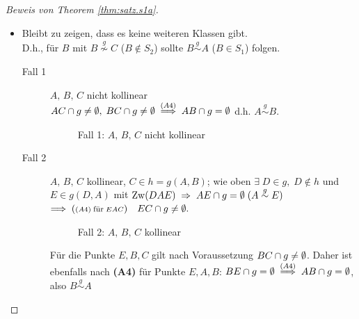\begin{proof}[Beweis von Theorem \ref{thm:satz.s1a}]
\begin{itemize}
        \item Bleibt zu zeigen, dass es keine weiteren Klassen gibt.\\
            D.h., für $B$ mit $B \stackrel{g}{\nsim} C$ ($B \notin S_2$) sollte $B
            \stackrel{g}{\sim} A$ ($B \in S_1$) folgen.


        \begin{description}
            \item[Fall 1] $A,\,B,\,C$ nicht kollinear\\
                ${AC} \cap g \neq \emptyset,\; {BC} \cap g \neq \emptyset\;
                \stackrel{(A4)}{\Longrightarrow}\; {AB} \cap g = \emptyset$ d.h. $A
                \stackrel{g}{\sim} B$.

                \begin{figure}[h]
                    
                    \caption{Fall 1: $A,\,B,\,C$ nicht kollinear}
                \end{figure}

            \item[Fall 2] $A,\, B,\, C$ kollinear, $C \in h = g(A,B)$; wie oben $\exists\; D \in
                g,\; D \notin h$ und $E \in g(D,A)$ mit $\operatorname{Zw}(DAE)\; \Rightarrow\; {AE} \cap g =
                \emptyset\; (A \stackrel{g}{\sim} E)$\\ $\Longrightarrow\; ({\scriptstyle (A4)\;
                \mbox{\footnotesize für}\; EAC}) \quad {EC} \cap g \neq \emptyset.$

                \begin{figure}[h]
                    
                    \caption{Fall 2: $A,\,B,\,C$ kollinear}
                \end{figure}

                Für die Punkte $E, B, C$ gilt nach Voraussetzung ${BC} \cap g \neq \emptyset$.
                Daher ist ebenfalls nach \textbf{(A4)} für Punkte $E, A, B$: ${BE} \cap g =
                \emptyset \; \stackrel{(A4)}{\Longrightarrow}\; {AB} \cap g = \emptyset$, also
                $B \stackrel{g}{\sim} A$
        \end{description}
    \end{itemize}
\end{proof}


